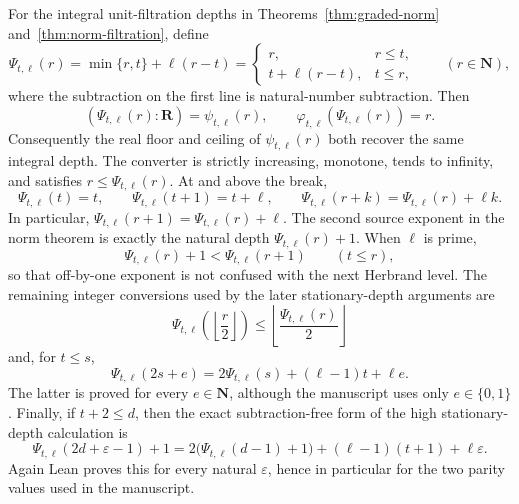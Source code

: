 \begin{definition}
For the integral unit-filtration depths in Theorems~\ref{thm:graded-norm}
and~\ref{thm:norm-filtration}, define
\[
 \Psi_{t,\ell}(r)=\min\{r,t\}+\ell(r-t)
 =\begin{cases}
   r,&r\le t,\\
   t+\ell(r-t),&t\le r,
  \end{cases}
 \qquad(r\in\mathbf N),
\]
where the subtraction on the first line is natural-number subtraction.
Then
\[
 (\Psi_{t,\ell}(r):\mathbf R)=\psi_{t,\ell}(r),
 \qquad
 \varphi_{t,\ell}(\Psi_{t,\ell}(r))=r.
\]
Consequently the real floor and ceiling of $\psi_{t,\ell}(r)$ both recover
the same integral depth.  The converter is strictly increasing, monotone,
tends to infinity, and satisfies $r\le\Psi_{t,\ell}(r)$.  At and above the
break,
\[
 \Psi_{t,\ell}(t)=t,
 \qquad
 \Psi_{t,\ell}(t+1)=t+\ell,
 \qquad
 \Psi_{t,\ell}(r+k)=\Psi_{t,\ell}(r)+\ell k.
\]
In particular,
\(\Psi_{t,\ell}(r+1)=\Psi_{t,\ell}(r)+\ell\).
The second source exponent in the norm theorem is exactly the natural
depth $\Psi_{t,\ell}(r)+1$.  When $\ell$ is prime,
\[
 \Psi_{t,\ell}(r)+1<\Psi_{t,\ell}(r+1)
 \qquad(t\le r),
\]
so that off-by-one exponent is not confused with the next Herbrand level.
The remaining integer conversions used by the later stationary-depth
arguments are
\[
 \Psi_{t,\ell}\!\left(\left\lfloor\frac r2\right\rfloor\right)
 \le
 \left\lfloor\frac{\Psi_{t,\ell}(r)}2\right\rfloor
\]
and, for $t\le s$,
\[
 \Psi_{t,\ell}(2s+e)
 =2\Psi_{t,\ell}(s)+(\ell-1)t+\ell e.
\]
The latter is proved for every $e\in\mathbf N$, although the manuscript
uses only $e\in\{0,1\}$.  Finally, if $t+2\le d$, then the exact
subtraction-free form of the high stationary-depth calculation is
\[
 \Psi_{t,\ell}(2d+\varepsilon-1)+1
 =2\bigl(\Psi_{t,\ell}(d-1)+1\bigr)
   +(\ell-1)(t+1)+\ell\varepsilon.
\]
Again Lean proves this for every natural $\varepsilon$, hence in particular
for the two parity values used in the manuscript.


\end{definition}
